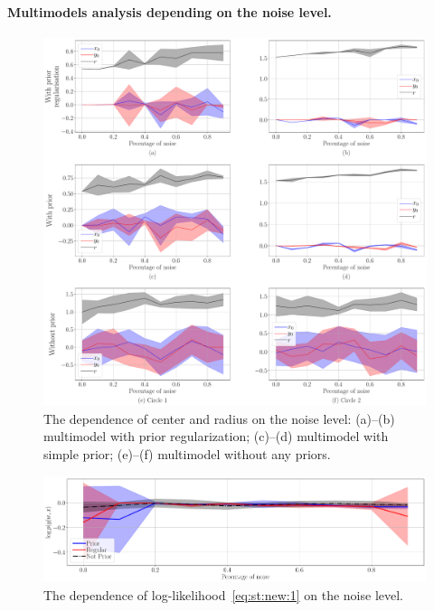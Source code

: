 \documentclass[12pt, twoside]{article}
\numberwithin{equation}{section}
\begin{document}
\paragraph{Multimodels analysis depending on the noise level.} 
\begin{figure}[h!t]\center
\includegraphics[width=1\textwidth]{result_eng/experiment_synthetic_param_progress_noise}
\caption{The dependence of center and radius on the noise level: (a)--(b) multimodel with prior regularization; (c)--(d) multimodel with simple prior; (e)--(f) multimodel without any priors.}
\label{experiment:st:3:1}
\end{figure}

\begin{figure}[h!t]\center
\includegraphics[width=1\textwidth]{result_eng/experiment_synt_likelihood_progress_noise}
\caption{The dependence of log-likelihood~\eqref{eq:st:new:1} on the noise level.}
\label{experiment:st:3:2}
\end{figure}
\end{document}
